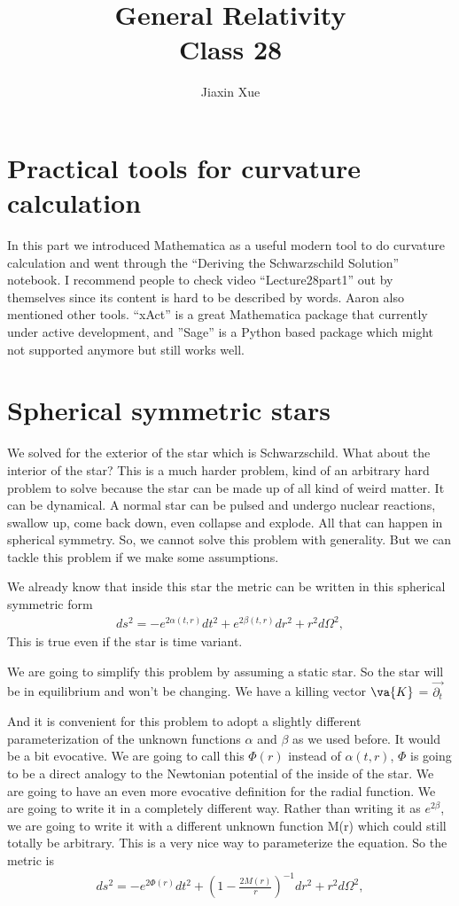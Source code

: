 \documentclass[10pt]{article}
\title{{\Huge General Relativity}\\{\Large{Class 28}}} %
\author{Jiaxin Xue}
\begin{document}
    \maketitle
    \flushbottom
    \newpage
    \pagestyle{fancynotes}
    \part{Practical tools for curvature calculation}
	In this part we introduced Mathematica as a useful modern tool to do curvature calculation and went through the “Deriving the Schwarzschild Solution” notebook. I recommend people to check video “Lecture28part1” out by themselves since its content is hard to be described by words. Aaron also mentioned other tools. “xAct” is a great Mathematica package that currently under active development, and ”Sage” is a Python based package which might not supported anymore but still works well.
	\newpage
	\part{Spherical symmetric stars}
	We solved for the exterior of the star which is Schwarzschild. What about the interior of the star? This is a much harder problem, kind of an arbitrary hard problem to solve because the star can be made up of all kind of weird matter. It can be dynamical. A normal star can be pulsed and undergo nuclear reactions, swallow up, come back down, even collapse and explode. All that can happen in spherical symmetry. So, we cannot solve this problem with generality. But we can tackle this problem if we make some assumptions. 
	
	We already know that inside this star the metric can be written in this spherical symmetric form
\begin{align}\label{GenMet2}
                ds^2 = -e^{2\alpha(t,r)}dt^2+e^{2\beta(t,r)}dr^2 +
                r^2d\Omega^2,
            \end{align}
This is true even if the star is time variant.

We are going to simplify this problem by assuming a static star. So the star will be in equilibrium and won’t be changing. We have a killing vector
$\va{K}$ = $\vec{\partial_t} $

And it is convenient for this problem to adopt a slightly different parameterization of the unknown functions $\alpha$ and $\beta$ as we used before. It would be a bit evocative. We are going to call this $\Phi(r)$ instead of $\alpha(t,r)$, $\Phi$ is going to be a direct analogy to the Newtonian potential of the inside of the star. We are going to have an even more evocative definition for the radial function. We are going to write it in a completely different way. Rather than writing it as $e^{2\beta}$, we are going to write it with a different unknown function M(r) which could still totally be arbitrary. This is a very nice way to parameterize the equation. So the metric is 
\begin{align}\label{GenMet2}
                ds^2 = -e^{2\Phi(r)}dt^2+(1-\frac{2M(r)}{r})^{-1}dr^2 +
                r^2d\Omega^2,
            \end{align}
\end{document}
